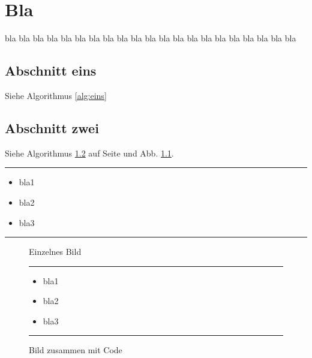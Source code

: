 \documentclass[a5paper,10pt,DIVcalc,ngerman,headsepline,liststotoc]{scrbook}
\begin{document}
\chapter{Bla}
bla bla bla bla bla bla bla bla bla bla bla bla bla bla bla bla bla bla
bla bla bla

\section{Abschnitt eins}

Siehe Algorithmus \ref{alg:eins}

\section{Abschnitt zwei}
Siehe Algorithmus \ref{alg:zwei} auf Seite \pageref{alg:zwei} und Abb.
\ref{fig:eins}.
\newpage

\begin{algorithmus}
\hrule
\smallskip
\centering
\begin{minipage}{.9\textwidth} %
\begin{itemize}
	\item bla1
	\item bla2
	\item bla3
\end{itemize}
\end{minipage}
\smallskip
\hrule
\caption{Ein einzelner Code}
\label{alg:eins}
\end{algorithmus}

\begin{figure}
	\centering
{}\par
\caption{Einzelnes Bild}
\label{fig:eins}
\end{figure}

\newpage

\begin{figure}
	\centering
{}\par
\caption{Bild zusammen mit Code}
\label{fig:zwei}
\vspace{\floatsep} %
\captionsetup[algorithmus]{position=t}
\label{alg:zwei}
\hrule
\smallskip
\centering
\begin{minipage}{.9\textwidth} %
\begin{itemize}
	\item bla1
	\item bla2
	\item bla3
\end{itemize}
\end{minipage}
\smallskip
\hrule
\end{figure}
\end{document}
